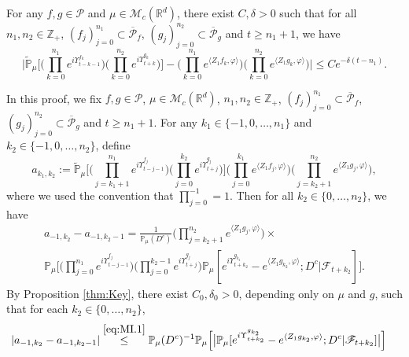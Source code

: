 \documentclass{amse-new}
\numberwithin{equation}{section}
\begin{document}
\begin{proposition} \label{cor:MI}
	For any  $f,g\in \mathcal P$ and $\mu\in \mathcal M_c(\mathbb R^d)$, there exist $C,\delta>0$ such that for all $n_1,n_2 \in \mathbb Z_+$, $(f_j)_{j=0}^{n_1}\subset \overline{\mathcal P}_f$, $(g_j)_{j=0}^{n_2}\subset \overline{\mathcal P}_g$ and $t\geq n_1+1$, we have
\begin{equation}
\label{32corollary}
	\Big|\mathbb{\widetilde{P}}_{\mu}\Big[  \Big(\prod_{k=0}^{n_1}e^{i \Upsilon^{f_k}_{t-k-1}}\Big)  \Big( \prod_{k=0}^{n_2}e^{i \Upsilon^{g_k}_{t+k} } \Big) \Big]  -  \Big(\prod_{k=0}^{n_1} e^{\langle Z_1f_k, \varphi\rangle}\Big) \Big(\prod_{k=0}^{n_2} e^{\langle Z_1g_k, \varphi\rangle}\Big) \Big|
	\leq C e^{-\delta (t-n_1)}.
\end{equation}
\end{proposition}
\begin{prof}
	In this proof, we fix $f,g\in \mathcal P$, $\mu\in \mathcal M_c(\mathbb R^d)$, $n_1,n_2 \in \mathbb Z_+$, $(f_j)_{j=0}^{n_1}\subset \overline{\mathcal P}_f$, $(g_j)_{j=0}^{n_2}\subset \overline{\mathcal P}_g$ and $t\geq n_1 + 1$.
 	For any $k_1 \in \{-1,0,\dots,n_1\}$ and $k_2 \in \{-1,0,\dots,n_2\}$,  define
\[
    a_{k_1,k_2}
    :=  \mathbb{\widetilde{P}}_{\mu}\Big[ \Big(\prod_{j=k_1+1}^{n_1} e^{i\Upsilon_{t-j-1}^{f_j}} \Big)  \Big(\prod_{j=0}^{k_2}e^{i\Upsilon_{t+j}^{g_j}}\Big) \Big] \Big(\prod_{j=0}^{k_1}e^{\langle Z_1 f_j, \varphi\rangle}\Big) \Big(\prod_{j=k_2+1}^{n_2} e^{ \langle Z_1g_j,\varphi \rangle} \Big),
\]
	where we used the convention that $\prod_{j=0}^{-1} =1.$
  	Then for all  $k_2 \in \{0,\dots,n_2\}$, we have
\begin{equation}
\label{eq:MI.1}
\begin{multlined}
	 a_{-1,k_2} - a_{-1,k_2-1}
	 = \frac{1}{\mathbb{P}_{\mu}(D^c)}  \Big(\prod_{j=k_2+1}^{n_2}e^{\langle Z_1g_j, \varphi\rangle}\Big) \times {}
	\\ \mathbb{P}_{\mu}\Big[\Big(\prod_{j=0}^{n_1}e^{i\Upsilon_{t-j-1}^{f_j}}\Big)\Big(\prod_{j=0}^{k_2-1} e^{i\Upsilon_{t+j}^{g_j}}\Big) \mathbb P_\mu[e^{i\Upsilon^{g_{k_2}}_{t+k_2}}-e^{\langle Z_1g_{k_2}, \varphi\rangle}; D^c|\mathscr F_{t+k_2}] \Big].
\end{multlined}
\end{equation}
	By Proposition \ref{thm:Key}, there exist $C_0,\delta_0 >0$,  depending only on $\mu$ and $g$, such that  for each $k_2 \in \{0, \dots, n_2 \}$,
\begin{align}
    &| a_{-1,k_2} - a_{-1,k_2-1}|
    \overset{\eqref{eq:MI.1}}\leq \mathbb{P}_{\mu}(D^c)^{-1}\mathbb{P}_{\mu}\Big[\big|\mathbb P_\mu[e^{i\Upsilon^{g_{k_2}}_{t+k_2}}-e^{\langle Z_1g_{k_2}, \varphi\rangle}; D^c|\mathscr F_{t+k_2}]\big|\Big]

\end{align}
\end{prof}
\end{document}
